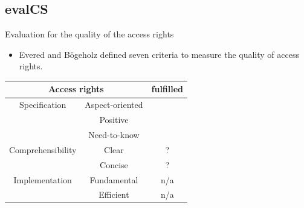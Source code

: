 \documentclass[18pt]{beamer}
\newcommand{\cmark}{\ding{51}}
\begin{document}
\subsection{evalCS}
\begin{frame}{Evaluation for the quality of the access rights}
\begin{itemize}
\item Evered and B\"ogeholz defined seven criteria to measure the quality of access rights.
\end{itemize}
\begin{table}
\centering
\begin{tabular}{|c|c|c|}
\hline 
\multicolumn{2}{|c|}{Access rights} & fulfilled \\ 
\hline 
Specification & Aspect-oriented & \cmark \\ 
\hline 
 & Positive & \cmark \\ 
\hline 
 & Need-to-know & \cmark \\ 
\hline 
Comprehensibility & Clear & ? \\ 
\hline 
 & Concise & ? \\ 
\hline 
Implementation & Fundamental & n/a \\ 
\hline 
 & Efficient & n/a \\ 
\hline 
\end{tabular} 

\end{table} 
\end{frame}
\end{document}
